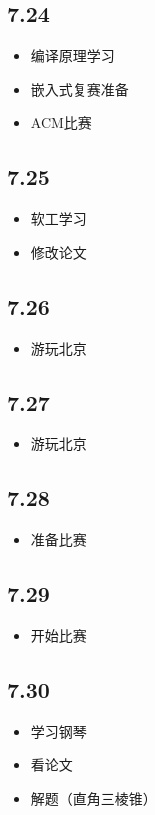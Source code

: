 \documentclass[UTF8]{ctexart}
\begin{document}
\subsection*{7.24}
\begin{itemize}
    \item 编译原理学习
    \item 嵌入式复赛准备
    \item ACM比赛
\end{itemize}
\subsection*{7.25}
\begin{itemize}
    \item 软工学习
    \item 修改论文
\end{itemize}
\subsection*{7.26}
\begin{itemize}
    \item 游玩北京
\end{itemize}
\subsection*{7.27}
\begin{itemize}
    \item 游玩北京
\end{itemize}
\subsection*{7.28}
\begin{itemize}
    \item 准备比赛
\end{itemize}
\subsection*{7.29}
\begin{itemize}
    \item 开始比赛
\end{itemize}
\subsection*{7.30}
\begin{itemize}
    \item 学习钢琴
    \item 看论文
    \item 解题（直角三棱锥）
\end{itemize}
\end{document}
